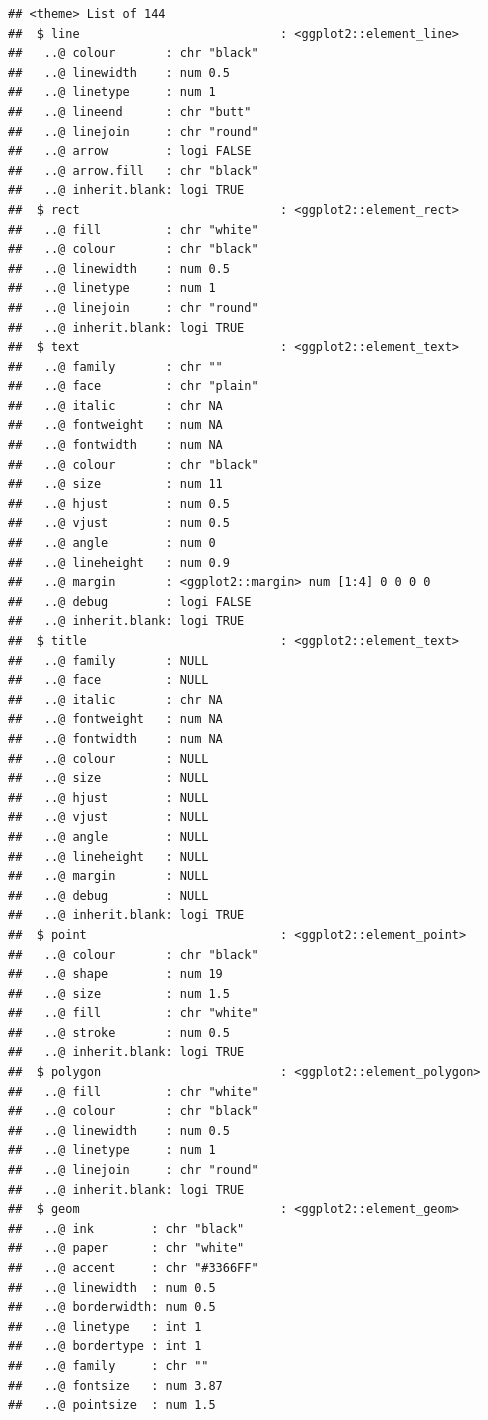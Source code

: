 \documentclass[
]{article}
\begin{document}
\begin{verbatim}
## <theme> List of 144
##  $ line                            : <ggplot2::element_line>
##   ..@ colour       : chr "black"
##   ..@ linewidth    : num 0.5
##   ..@ linetype     : num 1
##   ..@ lineend      : chr "butt"
##   ..@ linejoin     : chr "round"
##   ..@ arrow        : logi FALSE
##   ..@ arrow.fill   : chr "black"
##   ..@ inherit.blank: logi TRUE
##  $ rect                            : <ggplot2::element_rect>
##   ..@ fill         : chr "white"
##   ..@ colour       : chr "black"
##   ..@ linewidth    : num 0.5
##   ..@ linetype     : num 1
##   ..@ linejoin     : chr "round"
##   ..@ inherit.blank: logi TRUE
##  $ text                            : <ggplot2::element_text>
##   ..@ family       : chr ""
##   ..@ face         : chr "plain"
##   ..@ italic       : chr NA
##   ..@ fontweight   : num NA
##   ..@ fontwidth    : num NA
##   ..@ colour       : chr "black"
##   ..@ size         : num 11
##   ..@ hjust        : num 0.5
##   ..@ vjust        : num 0.5
##   ..@ angle        : num 0
##   ..@ lineheight   : num 0.9
##   ..@ margin       : <ggplot2::margin> num [1:4] 0 0 0 0
##   ..@ debug        : logi FALSE
##   ..@ inherit.blank: logi TRUE
##  $ title                           : <ggplot2::element_text>
##   ..@ family       : NULL
##   ..@ face         : NULL
##   ..@ italic       : chr NA
##   ..@ fontweight   : num NA
##   ..@ fontwidth    : num NA
##   ..@ colour       : NULL
##   ..@ size         : NULL
##   ..@ hjust        : NULL
##   ..@ vjust        : NULL
##   ..@ angle        : NULL
##   ..@ lineheight   : NULL
##   ..@ margin       : NULL
##   ..@ debug        : NULL
##   ..@ inherit.blank: logi TRUE
##  $ point                           : <ggplot2::element_point>
##   ..@ colour       : chr "black"
##   ..@ shape        : num 19
##   ..@ size         : num 1.5
##   ..@ fill         : chr "white"
##   ..@ stroke       : num 0.5
##   ..@ inherit.blank: logi TRUE
##  $ polygon                         : <ggplot2::element_polygon>
##   ..@ fill         : chr "white"
##   ..@ colour       : chr "black"
##   ..@ linewidth    : num 0.5
##   ..@ linetype     : num 1
##   ..@ linejoin     : chr "round"
##   ..@ inherit.blank: logi TRUE
##  $ geom                            : <ggplot2::element_geom>
##   ..@ ink        : chr "black"
##   ..@ paper      : chr "white"
##   ..@ accent     : chr "#3366FF"
##   ..@ linewidth  : num 0.5
##   ..@ borderwidth: num 0.5
##   ..@ linetype   : int 1
##   ..@ bordertype : int 1
##   ..@ family     : chr ""
##   ..@ fontsize   : num 3.87
##   ..@ pointsize  : num 1.5

\end{verbatim}
\end{document}
